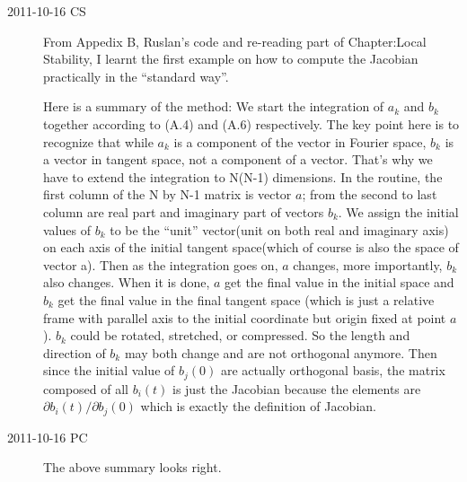 \begin{description}
\item[2011-10-16 CS]
From Appedix B, Ruslan's code and re-reading part of Chapter:Local Stability,
I learnt the first example on how to compute the Jacobian practically in the
``standard way''.

Here is a summary of the method:
We start the integration of ${a_k}$ and ${b_k}$ together according to
(A.4) and (A.6) respectively. The key point here is to recognize that
while ${a_k}$ is a component of the vector in Fourier space, $b_k$ is a
vector in tangent space, not a component of a vector. That's why we have
to extend the integration to N(N-1) dimensions. In the routine, the first
column of the N by N-1 matrix is vector $a$; from the second to last
column are real part and imaginary part of vectors ${b_k}$. We assign the
initial values of ${b_k}$ to be the ``unit'' vector(unit on both real and
imaginary axis) on each axis of the initial tangent space(which of course
is also the space of vector a). Then as the integration goes on, $a$
changes, more importantly, ${b_k}$ also changes. When it is done, $a$ get
the final value in the initial space and ${b_k}$ get the final value in
the final tangent space (which is just a relative frame with parallel axis
to the initial coordinate but origin fixed at point $a$). ${b_k}$ could
be rotated, stretched, or compressed. So the length and direction of
${b_k}$ may both change and are not orthogonal anymore. Then since the
initial value of ${b_j(0)}$ are actually orthogonal basis, the matrix
composed of all ${b_i(t)}$ is just the Jacobian because the elements are
$\partial{b_i(t)}/\partial{b_j(0)}$ which is exactly the definition of
Jacobian.

\item[2011-10-16 PC] The above summary looks right.

\end{description}
